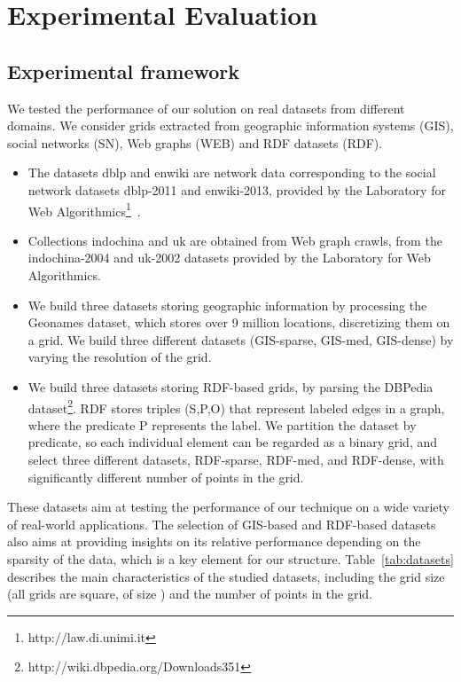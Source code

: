 \documentclass{elsarticle}
\newcommand{\dblp}{\textsf{dblp}\xspace}
\newcommand{\enwiki}{\textsf{enwiki}\xspace}
\newcommand{\indo}{\textsf{indochina}\xspace}
\newcommand{\uk}{\textsf{uk}\xspace}
\newcommand{\giss}{\textsf{GIS-sparse}\xspace}
\newcommand{\gism}{\textsf{GIS-med}\xspace}
\newcommand{\gisd}{\textsf{GIS-dense}\xspace}
\newcommand{\rdfs}{\textsf{RDF-sparse}\xspace}
\newcommand{\rdfm}{\textsf{RDF-med}\xspace}
\newcommand{\rdfd}{\textsf{RDF-dense}\xspace}
\begin{document}
\section{Experimental Evaluation}
\label{sec:experiments}

\subsection{Experimental framework}

We tested the performance of our solution on real datasets from different domains. We consider grids extracted from geographic information systems (GIS), social networks (SN), Web graphs (WEB) and RDF datasets (RDF). 

\begin{itemize}
\item The datasets \dblp and \enwiki are network data corresponding to the social network datasets dblp-2011 and enwiki-2013, provided by the Laboratory for Web Algorithmics\footnote{{http://law.di.unimi.it}}~\cite{BoVWFI,BRSLLP}.
\item Collections \indo and \uk are obtained from Web graph crawls, from the indochina-2004 and uk-2002 datasets provided by the Laboratory for Web Algorithmics.
\item We build three datasets storing geographic information by processing the Geonames dataset, which stores over 9 million locations, discretizing them on a grid. We build three different datasets (\giss, \gism, \gisd) by varying the resolution of the grid.
\item We build three datasets storing RDF-based grids, by parsing the DBPedia dataset\footnote{http://wiki.dbpedia.org/Downloads351}. RDF stores triples (S,P,O) that represent labeled edges in a graph, where the predicate P represents the label. We partition the dataset by predicate, so each individual element can be regarded as a binary grid, and select three different datasets, \rdfs, \rdfm, and \rdfd, with significantly different number of points in the grid.
\end{itemize}

These datasets aim at testing the performance of our technique on a wide variety of real-world applications. The selection of GIS-based and RDF-based datasets also aims at providing insights on its relative performance depending on the sparsity of the data, which is a key element for our structure. Table~\ref{tab:datasets} describes the main characteristics of the studied datasets, including the grid size (all grids are square, of size ) and the number  of points in the grid.
\end{document}
